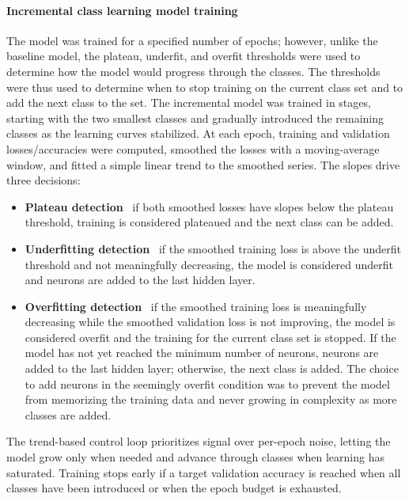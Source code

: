 \documentclass[conference]{IEEEtran}
\begin{document}
\paragraph{Incremental class learning model training}
The model was trained for a specified number of epochs; however, unlike the baseline model, the plateau, underfit, and overfit thresholds were used to determine how the 
model would progress through the classes. The thresholds were thus used to determine when to stop training on the current class set and to add the next class to the set. 
The incremental model was trained in stages, starting with the two smallest classes and gradually 
introduced the remaining classes as the learning curves stabilized. At each epoch, training and validation 
losses/accuracies were computed, smoothed the losses with a moving-average window, and fitted a simple linear trend 
to the smoothed series. The slopes drive three decisions:
\begin{itemize}
  \item \textbf{Plateau detection} \textemdash\ if both smoothed losses have slopes below the plateau threshold, training is considered plateaued and the next class can be added.
  \item \textbf{Underfitting detection} \textemdash\ if the smoothed training loss is above the underfit threshold and not meaningfully decreasing, the model is considered underfit and neurons are added to the last hidden layer.
  \item \textbf{Overfitting detection} \textemdash\ if the smoothed training loss is meaningfully decreasing while the smoothed validation loss is not improving, the model is considered overfit and the training for the current class set is stopped. 
 If the model has not yet reached the minimum number of neurons, neurons are added to the last hidden layer; otherwise, the next class is added. The choice to add 
 neurons in the seemingly overfit condition was to prevent the model from memorizing the training data and never growing in complexity as more classes are added. 
\end{itemize}

The trend-based control loop prioritizes signal over per-epoch noise, letting the model grow only when needed and advance through classes when learning has
saturated. Training stops early if a target validation accuracy is reached when all classes have been introduced or when the epoch budget is exhausted.
\end{document}
